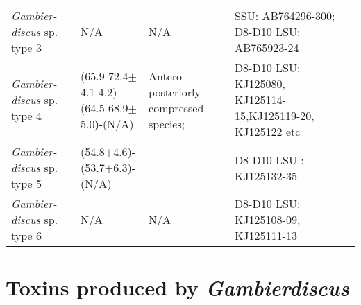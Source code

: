 \documentclass[12pt]{article}
\begin{document}
\begin{longtable}{  p{2cm}  p{2.7cm}  p{4.5cm}  p{3.1cm}  p{1cm}  }
 \emph{Gambier- discus} sp. type 3 & N/A & N/A & SSU: AB764296-300; D8-D10 LSU: AB765923-24& \cite{nishimura2013genetic} \\
 \emph{Gambier- discus} sp. type 4  & (65.9-72.4$\pm$4.1-4.2)-(64.5-68.9$\pm$5.0)-(N/A) & Antero-posteriorly compressed species;  & D8-D10 LSU: KJ125080, KJ125114-15,KJ125119-20, KJ125122 etc  & \cite{xu2014distribution} \\
 \emph{Gambier- discus} sp. type 5  & (54.8$\pm$4.6)-(53.7$\pm$6.3)- (N/A) &  & D8-D10 LSU : KJ125132-35 & \cite{xu2014distribution} \\
 \emph{Gambier- discus} sp. type 6 & N/A & N/A & D8-D10 LSU: KJ125108-09, KJ125111-13 & \cite{xu2014distribution} \\
\end{longtable}
\FloatBarrier

\section{Toxins produced by \emph{Gambierdiscus}}

\end{document}
